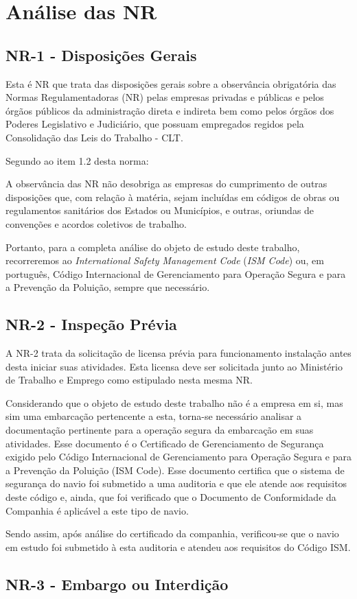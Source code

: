 \chapter{Análise das NR}
\section{NR-1 - Disposições Gerais}
Esta é NR que trata das disposições gerais sobre a observância obrigatória das Normas Regulamentadoras (NR) pelas empresas privadas e públicas e pelos órgãos públicos da administração direta e indireta bem como pelos órgãos dos Poderes Legislativo e Judiciário, que possuam empregados regidos pela Consolidação das Leis do Trabalho - CLT.

Segundo ao item 1.2 desta norma:

\begin{citacao}
A observância das NR não desobriga as empresas do cumprimento de outras disposições que, com relação à matéria, sejam incluídas em códigos de obras ou regulamentos sanitários dos Estados ou Municípios, e outras, oriundas de convenções e acordos coletivos de trabalho.
\end{citacao}

Portanto, para a completa análise do objeto de estudo deste trabalho, recorreremos ao \emph{International Safety Management Code} (\emph{ISM Code}) ou, em português, Código Internacional de Gerenciamento para Operação Segura e para a Prevenção da Poluição, sempre que necessário.

\section{NR-2 - Inspeção Prévia}
A NR-2 trata da solicitação de licensa prévia para funcionamento instalação antes desta iniciar suas atividades. Esta licensa deve ser solicitada junto ao Ministério de Trabalho e Emprego como estipulado nesta mesma NR.

Considerando que o objeto de estudo deste trabalho não é a empresa em si, mas sim uma embarcação pertencente a esta, torna-se necessário analisar a documentação pertinente para a operação segura da embarcação em suas atividades. Esse documento é o Certificado de Gerenciamento de Segurança exigido pelo Código Internacional de Gerenciamento para Operação Segura e para a Prevenção da Poluição (ISM Code). Esse documento certifica que o sistema de segurança do navio foi submetido a uma auditoria e que ele atende aos requisitos deste código e, ainda, que foi verificado que o Documento de Conformidade da Companhia é aplicável a este tipo de navio.

Sendo assim, após análise do certificado da companhia, verificou-se que o navio em estudo foi submetido à esta auditoria e atendeu aos requisitos do Código ISM.

\section{NR-3 - Embargo ou Interdição}
